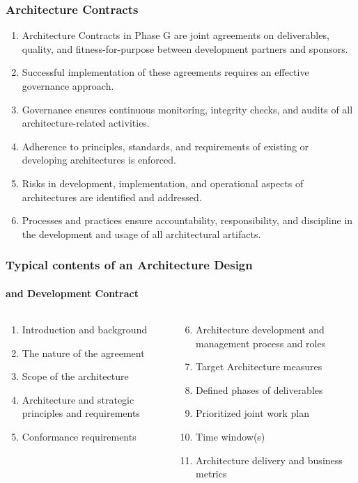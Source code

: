 \documentclass[aspectratio=169, table]{beamer}
\begin{document}
	\begin{frame}
		\frametitle{Architecture Contracts}
		\vspace{25pt}
		\begin{enumerate}
			\item Architecture Contracts in Phase G are joint agreements on deliverables, quality, and fitness-for-purpose between development partners and sponsors.
			\item Successful implementation of these agreements requires an effective governance approach.
			\item Governance ensures continuous monitoring, integrity checks, and audits of all architecture-related activities.
			\item Adherence to principles, standards, and requirements of existing or developing architectures is enforced.
			\item Risks in development, implementation, and operational aspects of architectures are identified and addressed.
			\item Processes and practices ensure accountability, responsibility, and discipline in the development and usage of all architectural artifacts.
		\end{enumerate}
		
		
	\end{frame}
	
	\begin{frame}
		\frametitle{Typical contents of an Architecture Design}
		\framesubtitle{and Development Contract}
		\vspace{22pt}
		\begin{columns}[onlytextwidth]
			\begin{column}{0.45\textwidth}
				\begin{enumerate}
					\item Introduction and background
					\item The nature of the agreement
					\item Scope of the architecture
					\item Architecture and strategic principles and requirements
					\item Conformance requirements
				\end{enumerate}
			\end{column}
			\begin{column}{0.55\textwidth}
				\begin{enumerate}
					\setcounter{enumi}{5}
					\item Architecture development and management process and roles
						\item Target Architecture measures
					\item Defined phases of deliverables
					\item Prioritized joint work plan
					\item Time window(s)
					\item Architecture delivery and business metrics
				\end{enumerate}
			\end{column}
		\end{columns}
	\end{frame}
	
\end{document}
